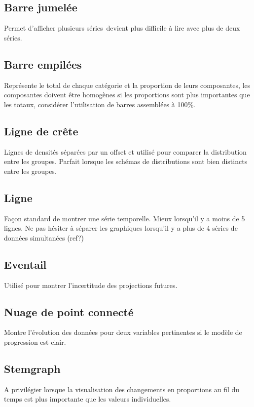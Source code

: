\documentclass[a4paper,12pt]{article}
\begin{document}
\begin{multicols}{2}
\subsection*{Barre jumelée}
\label{sec:orgc711010}
Permet d'afficher plusieurs séries devient plus difficile à lire avec plus de deux séries. \autocite{alansmithLexiqueVisuel}
\subsection*{Barre empilées}
\label{sec:org1b80eb4}
Représente le total de chaque catégorie et la proportion de leurs composantes, les composantes doivent être homogènes si les proportions sont plus importantes que les totaux, considérer l'utilisation de barres assemblées à 100\%. \autocite{mikeyiHowChooseRight2020}
\subsection*{Ligne de crête}
\label{sec:orga8250ea}
Lignes de densités séparées par un offset et utilisé pour comparer la distribution entre les groupes. Parfait lorsque les schémas de distributions sont bien distincts entre les groupes. \autocite{mikeyiHowChooseRight2020}
\subsection*{Ligne}
\label{sec:orgf255018}
Façon standard de montrer une série temporelle. \autocite{alansmithLexiqueVisuel}
Mieux lorsqu'il y a moins de 5 lignes. \autocite{mikeyiHowChooseRight2020}  Ne pas hésiter à séparer les graphiques lorsqu'il y a plus de 4 séries de données simultanées (ref?)
\subsection*{Eventail}
\label{sec:org819a238}
Utilisé pour montrer l'incertitude des projections futures. \autocite{alansmithLexiqueVisuel}
\subsection*{Nuage de point connecté}
\label{sec:org6f4c6d2}
Montre l'évolution des données pour deux variables pertinentes si le modèle de progression est clair. \autocite{alansmithLexiqueVisuel}
\subsection*{Stemgraph}
\label{sec:org6395987}
A privilégier lorsque la visualisation des changements en proportions au fil du temps est plus importante que les valeurs individuelles. \autocite{alansmithLexiqueVisuel}

\end{multicols}
\end{document}
